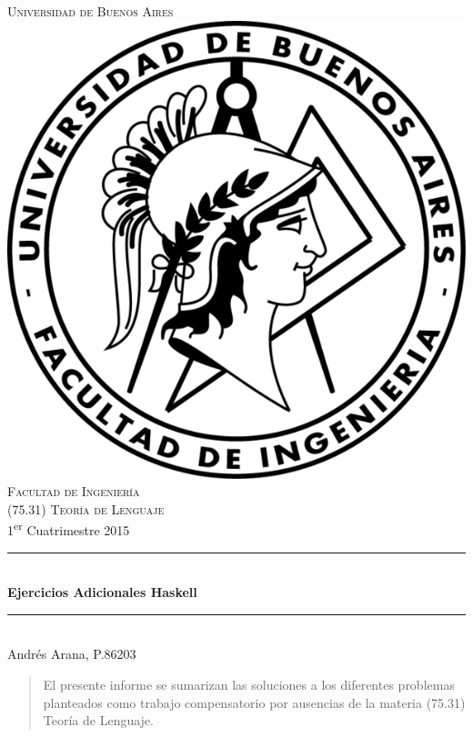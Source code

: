 \documentclass[12pt]{article}
\begin{document}
\begin{titlepage}

\newcommand{\HRule}{\rule{\linewidth}{0.5mm}}

\center

\textsc{\LARGE Universidad de Buenos Aires}\\[1.5cm]

\includegraphics{docs/images/logo-fiuba.png}\\[1cm]

\textsc{\Large Facultad de Ingeniería}\\[0.5cm]
\textsc{\large (75.31) Teoría de Lenguaje}\\[0.5cm]
{\large 1\textsuperscript{er} Cuatrimestre 2015}\\[0.5cm]

\HRule \\[0.4cm]
{ \huge \bfseries Ejercicios Adicionales Haskell}\\[0.4cm]
\HRule \\[1.5cm]

\large Andrés Arana, P.86203

\vfill

\end{titlepage}

\begin{abstract}

El presente informe se sumarizan las soluciones a los diferentes problemas
planteados como trabajo compensatorio por ausencias de la materia (75.31)
Teoría de Lenguaje.

\end{abstract}
\end{document}
